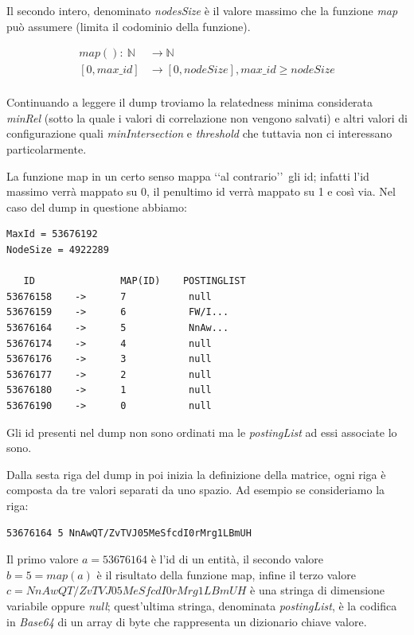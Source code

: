 Il secondo intero, denominato \textit{nodesSize} è il valore massimo che la funzione \textit{map} può assumere (limita il codominio della funzione).

\begin{equation}\begin{split}
    map():\ \mathbb{N} & \rightarrow \mathbb{N}\\
            [0,max\_id] & \rightarrow [0, nodeSize], max\_id \geq nodeSize\\
\end{split}\end{equation}

Continuando a leggere il dump troviamo la relatedness minima considerata \textit{minRel} (sotto la quale i valori di correlazione non vengono salvati) 
e altri valori di configurazione quali \textit{minIntersection} e \textit{threshold} che tuttavia non ci interessano particolarmente.

La funzione map in un certo senso mappa \lq\lq al contrario\rq\rq\ gli id; infatti l'id massimo verrà mappato su 0, il penultimo id verrà mappato su 1 e così via.
Nel caso del dump in questione abbiamo:

\begin{lstlisting}[style=TeXStyle]
MaxId = 53676192
NodeSize = 4922289

   ID		        MAP(ID)    POSTINGLIST
53676158    ->      7           null
53676159    ->      6           FW/I...
53676164    ->      5           NnAw...
53676174    ->      4           null
53676176    ->      3           null
53676177    ->      2           null
53676180    ->      1           null
53676190    ->      0           null
\end{lstlisting}

Gli id presenti nel dump non sono ordinati ma le \textit{postingList} ad essi associate lo sono.

Dalla sesta riga del dump in poi inizia la definizione della matrice, ogni riga è composta da tre valori separati da uno spazio. 
Ad esempio se consideriamo la riga:
\begin{lstlisting}[style=TeXStyle]
53676164 5 NnAwQT/ZvTVJ05MeSfcdI0rMrg1LBmUH
\end{lstlisting}

Il primo valore $a = 53676164$ è l'id di un entità, il secondo valore $b = 5 = map(a)$ è il risultato della funzione map, 
infine il terzo valore $c = NnAwQT/ZvTVJ05MeSfcdI0rMrg1LBmUH$ è una stringa di dimensione variabile oppure \textit{null};
quest'ultima stringa, denominata \textit{postingList}, è la codifica in \textit{Base64} di un array di byte che rappresenta un dizionario chiave valore. 

